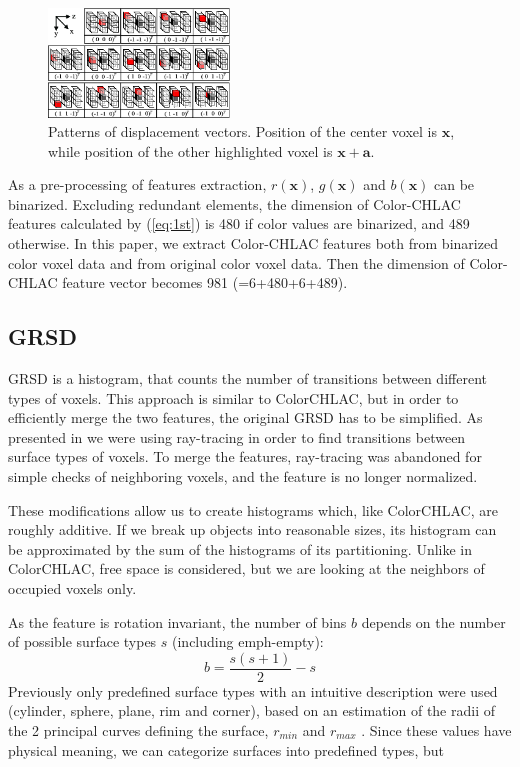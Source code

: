 \documentclass[conference]{sty/IEEEtran}
\begin{document}
\begin{figure}[htb!]
  \begin{center}
    \includegraphics[width=0.43\textwidth]{figures/colorCHLAC/displacement_vectors.png}
    \caption{Patterns of displacement vectors. Position of the center voxel is ${\bm x}$,
      while position of the other highlighted voxel is ${\bm x}+{\bm a}$. }
    \label{fig:displacement_vectors}
  \end{center}
\end{figure}

As a pre-processing of features extraction, $r(\bm{x})$, $g(\bm{x})$ and $b(\bm{x})$ can be binarized.
Excluding redundant elements, the dimension of Color-CHLAC features calculated by (\ref{eq:1st}) is
    480 if color values are binarized, and 489 otherwise.
In this paper, we extract Color-CHLAC features both from binarized color voxel data and from original color voxel data.
Then the dimension of Color-CHLAC feature vector becomes 981 (=6+480+6+489).


\subsection{GRSD}
%
GRSD is a histogram, that counts the number of transitions between different types of voxels.
This approach is similar to ColorCHLAC, but in order to efficiently merge the two features,
the original GRSD has to be simplified. As presented in \cite{GRSD10Humanoids} we were using
ray-tracing in order to find transitions between surface types of voxels. To merge the features,
ray-tracing was abandoned for simple checks of neighboring voxels, and the feature is no longer normalized.

These modifications allow us to create histograms which, like ColorCHLAC, are roughly additive.
If we break up objects into reasonable sizes, its histogram can be approximated by the sum of the
histograms of its partitioning. Unlike in ColorCHLAC, free space is considered, but we are looking
at the neighbors of occupied voxels only.

As the feature is rotation invariant, the number of bins $b$ depends on the number of possible surface types $s$ (including emph-empty):
\begin{equation}
b=\frac{s(s+1)}{2}-s
\end{equation}
Previously only predefined surface types with an intuitive description were used (cylinder, sphere, plane, rim and corner),
based on an estimation of the radii of the 2 principal curves defining the surface, $r_{min}$ and $r_{max}$ \cite{Marton10IROS}.
Since these values have physical meaning, we can categorize surfaces into predefined types, but
\end{document}
